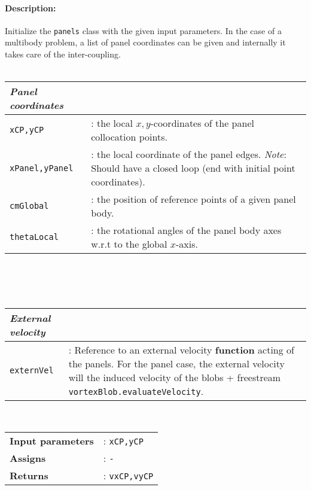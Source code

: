 	\paragraph{Description:} Initialize the \texttt{panels} class with the given input parameters. In the case of a multibody problem, a list of panel coordinates can be given and internally it takes care of the inter-coupling.\\
	\\
	\begin{tabular}{lp{10cm}}
				\textit{Panel coordinates} & \\ \hline
				\texttt{xCP,yCP} &:  the local $x,y$-coordinates of the panel collocation points.\\ 
				\texttt{xPanel,yPanel} &: the local coordinate of the panel edges. \textit{Note}: Should have a closed loop (end with initial point coordinates).\\ 
				\texttt{cmGlobal} &:  the position of reference points of a given panel body.\\
				\texttt{thetaLocal} &:  the rotational angles of the panel body axes w.r.t to the global $x$-axis.\\
	\end{tabular}\\ 
    \\ \\
	\begin{tabular}{lp{10cm}}
				\textit{External velocity} & \\ \hline
				\texttt{externVel} &:  Reference to an external velocity \textbf{function} acting of the panels. For the panel case, the external velocity will the induced velocity of the blobs + freestream \texttt{vortexBlob.evaluateVelocity}.\\
	\end{tabular}\\
	
		\begin{tabular}{lp{10cm}}
			\textbf{Input parameters} &: \texttt{xCP,yCP}\\ 
			\textbf{Assigns} &: \texttt{-}\\ 			
			\textbf{Returns} &: \texttt{vxCP,vyCP}\\ 					
		\end{tabular}\\


\newpage

